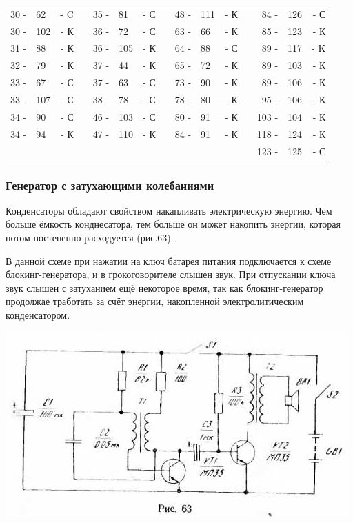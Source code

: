 \documentclass[12pt]{article}
\begin{document}
\hrulefill

\begin{tabular}{r l r p{0.5cm} r l r p{0.5cm} r l r p{0.5cm} r l r}
30 - &  62 & - C &   & 35 - &  81 & - С &   &  48 - & 111 & - К &   &  84 - & 126  & - С\\
30 - & 102 & - К &   & 36 - &  72 & - С &   &  63 - &  66 & - К &   &  85 - & 123  & - К\\
31 - &  88 & - К &   & 36 - & 105 & - К &   &  64 - &  88 & - С &   &  89 - & 117  & - K\\
32 - &  79 & - К &   & 37 - &  44 & - К &   &  65 - &  72 & - К &   &  89 - & 103  & - К\\
33 - &  67 & - С &   & 37 - &  63 & - С &   &  73 - &  90 & - К &   &  89 - & 106  & - К\\
33 - & 107 & - С &   & 38 - &  78 & - С &   &  78 - &  80 & - К &   &  95 - & 106  & - К\\
34 - &  90 & - С &   & 46 - & 103 & - С &   &  80 - &  91 & - К &   & 103 - & 104  & - К\\
34 - &  94 & - К &   & 47 - & 110 & - К &   &  84 - &  91 & - К &   & 118 - & 124  & - К\\
     &     &     &   &      &     &     &   &       &     &     &   & 123 - & 125  & - С\\
\end{tabular}

\hrulefill

\subsubsection{ Генератор с затухающими колебаниями}

Конденсаторы обладают свойством накапливать электрическую энергию. Чем больше ёмкость конднесатора, тем больше он может накопить энергии, которая потом постепенно расходуется (рис.63).

\newpage

В данной схеме при нажатии на ключ батарея питания подключается к схеме блокинг-генератора, и в грокоговорителе слышен звук. При отпускании ключа звук слышен с затуханием ещё некоторое время, так как блокинг-генератор продолжае тработать за счёт энергии, накопленной электролитическим конденсатором.

\includegraphics[scale=1, angle=1]{ekon3_063_1}
\end{document}
